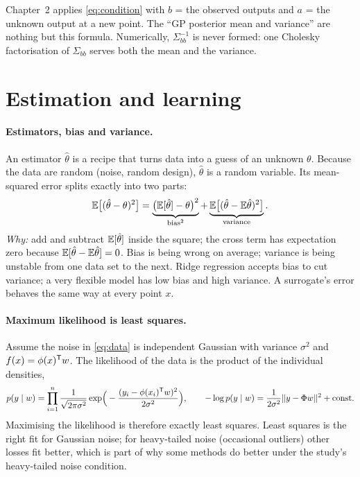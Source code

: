 \begin{connection}
Chapter~2 applies \eqref{eq:condition} with $b$ = the observed outputs and $a$ = the unknown output at a new point.
The ``GP posterior mean and variance'' are nothing but this formula. Numerically, $\Sigma_{bb}^{-1}$ is never formed:
one Cholesky factorisation of $\Sigma_{bb}$ serves both the mean and the variance.
\end{connection}

\section{Estimation and learning}
\label{sec:estimation}

\paragraph{Estimators, bias and variance.} An estimator $\hat\theta$ is a recipe that turns data into a guess of an
unknown $\theta$. Because the data are random (noise, random design), $\hat\theta$ is a random variable. Its
mean-squared error splits exactly into two parts:
\begin{equation}
  \mathbb{E}\big[(\hat\theta - \theta)^2\big]
  = \underbrace{\big(\mathbb{E}[\hat\theta] - \theta\big)^2}_{\text{bias}^2}
  + \underbrace{\mathbb{E}\big[(\hat\theta - \mathbb{E}\hat\theta)^2\big]}_{\text{variance}} .
  \label{eq:biasvar}
\end{equation}
\emph{Why:} add and subtract $\mathbb{E}[\hat\theta]$ inside the square; the cross term has expectation zero because
$\mathbb{E}[\hat\theta - \mathbb{E}\hat\theta] = 0$. Bias is being wrong on average; variance is being unstable from one data set to
the next. Ridge regression accepts bias to cut variance; a very flexible model has low bias and high variance. A
surrogate's error behaves the same way at every point $x$.

\paragraph{Maximum likelihood is least squares.} Assume the noise in \eqref{eq:data} is independent Gaussian with
variance $\sigma^2$ and $f(x) = \phi(x)^{\mathsf{T}} w$. The likelihood of the data is the product of the individual densities,
\begin{equation}
  p(y \mid w) = \prod_{i=1}^n \frac{1}{\sqrt{2\pi\sigma^2}}
  \exp\!\Big(-\frac{(y_i - \phi(x_i)^{\mathsf{T}} w)^2}{2\sigma^2}\Big),
  \qquad
  -\log p(y\mid w) = \frac{1}{2\sigma^2}\lVert y - \Phi w\rVert^2 + \text{const}.
\end{equation}
Maximising the likelihood is therefore exactly least squares. Least squares is the right fit for Gaussian noise; for
heavy-tailed noise (occasional outliers) other losses fit better, which is part of why some methods do better under
the study's heavy-tailed noise condition.

